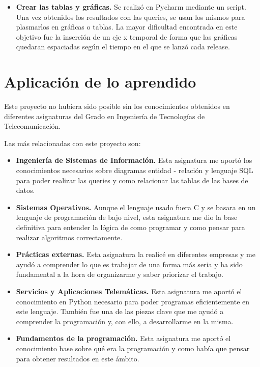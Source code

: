 \documentclass[a4paper, 12pt]{book}
\begin{document}
\begin{itemize}
	
	\item \textbf {Crear las tablas y gráficas.} Se realizó en Pycharm mediante un script. Una vez obtenidos los resultados con las queries, se usan los mismos para plasmarlos en gráficas o tablas. La mayor dificultad encontrada en este objetivo fue la inserción de un eje x temporal de forma que las gráficas quedaran espaciadas según el tiempo en el que se lanzó cada release.
\end{itemize}


\section{Aplicación de lo aprendido}
\label{sec:aplicacion}

Este proyecto no hubiera sido posible sin los conocimientos obtenidos en diferentes asignaturas del Grado en Ingeniería de Tecnologías de Telecomunicación.

Las más relacionadas con este proyecto son: 

\begin{itemize}
	\item \textbf {Ingeniería de Sistemas de Información.} Esta asignatura me aportó los conocimientos necesarios sobre diagramas entidad - relación y lenguaje SQL para poder realizar las queries y como relacionar las tablas de las bases de datos.
	
	\item \textbf {Sistemas Operativos.} Aunque el lenguaje usado fuera C y se basara en un lenguaje de programación de bajo nivel, esta asignatura me dio la base definitiva para entender la lógica de como programar y como pensar para realizar algoritmos correctamente.
	
	\item \textbf {Prácticas externas.} Esta asignatura la realicé en diferentes empresas y me ayudó a comprender lo que es trabajar de una forma más seria y ha sido fundamental a la hora de organizarme y saber priorizar el trabajo.
	
	\item \textbf {Servicios y Aplicaciones Telemáticas.} Esta asignatura me aportó el conocimiento en Python necesario para poder programas eficientemente en este lenguaje. También fue una de las piezas clave que me ayudó a comprender la programación y, con ello, a desarrollarme en la misma.
	
	\item \textbf {Fundamentos de la programación.} Esta asignatura me aportó el conocimiento base sobre qué era la programación y como había que pensar para obtener resultados en este ámbito.
	
\end{itemize}
\end{document}
